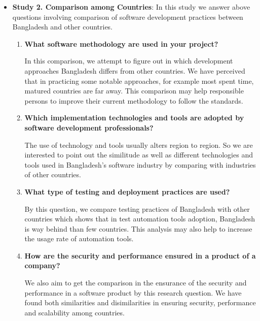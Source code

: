 \begin{itemize}[leftmargin=10pt]
\begin{enumerate}[label={\textbf{RQ\arabic{*}.}}, leftmargin=30pt]
    \end{enumerate}
    
\item \textbf{Study  2. Comparison among Countries}: In this study we answer above questions involving comparison of software development practices between Bangladesh and other countries.

    \begin{enumerate}[label={\textbf{RQ\arabic{*}.}}, leftmargin=30pt]
    \item \textbf{What software methodology are used in your project?}
    
    In this comparison, we attempt to figure out in which development approaches Bangladesh differs from other countries. We have perceived that in practicing some notable approaches, for example most spent time, matured countries are far away. This comparison may help responsible persons to improve their current methodology to follow the standards.
    
    \item \textbf{Which implementation technologies and tools are adopted by software development professionals?}
    
    The use of technology and tools usually alters region to region. So we are interested to point out the similitude as well as different technologies and tools used in Bangladesh's software industry by comparing with industries of other countries.
    
    \item \textbf{What type of testing and deployment practices are used?}
    
    By this question, we compare testing practices of Bangladesh with other countries which shows that in test automation tools adoption, Bangladesh is way behind than few countries. This analysis may also help to increase the usage rate of automation tools.
    
    \item \textbf{How are the security and performance ensured in a product of a company?}
    
    We also aim to get the comparison in the ensurance of the security and performance in a software product by this research question. We have found both similarities and disimilarities in ensuring security, performance and scalability among countries.
    
    \end{enumerate}
    
\end{itemize}

